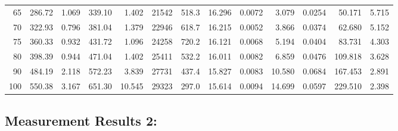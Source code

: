\documentclass[10pt]{article}
\begin{document}
{\begin{tabular}{|r|rr|rr|rr|rr|rr|r|r|}
       65 &       286.72 &        1.069 &       339.10 &        1.402 &        21542 &        518.3 &       16.296 &       0.0072 &        3.079 &       0.0254 &       50.171 &        5.715 \\
       70 &       322.93 &        0.796 &       381.04 &        1.379 &        22946 &        618.7 &       16.215 &       0.0052 &        3.866 &       0.0374 &       62.680 &        5.152 \\
       75 &       360.33 &        0.932 &       431.72 &        1.096 &        24258 &        720.2 &       16.121 &       0.0068 &        5.194 &       0.0404 &       83.731 &        4.303 \\
       80 &       398.39 &        0.944 &       471.04 &        1.402 &        25411 &        532.2 &       16.011 &       0.0082 &        6.859 &       0.0476 &      109.818 &        3.628 \\
       90 &       484.19 &        2.118 &       572.23 &        3.839 &        27731 &        437.4 &       15.827 &       0.0083 &       10.580 &       0.0684 &      167.453 &        2.891 \\
      100 &       550.38 &        3.167 &       651.30 &       10.545 &        29323 &        297.0 &       15.614 &       0.0094 &       14.699 &       0.0597 &      229.510 &        2.398 \\
\hline
\end{tabular}
}



\subsection*{\large \bf Measurement Results 2:}
\end{document}
